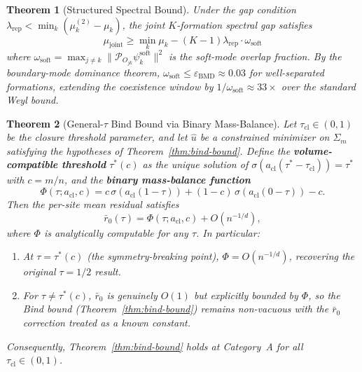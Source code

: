 \documentclass[lettersize,journal]{IEEEtran}
\newtheorem{theorem}{Theorem}
\begin{document}
\begin{theorem}[Structured Spectral Bound]
\label{thm:beyond-weyl}
Under the gap condition $\lambda_{\mathrm{rep}} < \min_k(\mu_k^{(2)} - \mu_k)$, the joint $K$-formation spectral gap satisfies
\begin{equation}
\label{eq:beyond-weyl}
\mu_{\mathrm{joint}} \geq \min_k \mu_k - (K-1)\lambda_{\mathrm{rep}} \cdot \omega_{\mathrm{soft}}
\end{equation}
where $\omega_{\mathrm{soft}} = \max_{j \neq k} \|\mathcal{P}_{O_{jk}} \psi_k^{\mathrm{soft}}\|^2$ is the soft-mode overlap fraction. By the boundary-mode dominance theorem, $\omega_{\mathrm{soft}} \leq \varepsilon_{\mathrm{BMD}} \approx 0.03$ for well-separated formations, extending the coexistence window by $1/\omega_{\mathrm{soft}} \approx 33\times$ over the standard Weyl bound.
\end{theorem}

\begin{theorem}[General-$\tau$ Bind Bound via Binary Mass-Balance]
\label{thm:bind-general-tau}
Let $\tau_{\mathrm{cl}} \in (0,1)$ be the closure threshold parameter, and let $\hat{u}$ be a constrained minimizer on $\Sigma_m$ satisfying the hypotheses of Theorem~\ref{thm:bind-bound}. Define the \textbf{volume-compatible threshold} $\tau^*(c)$ as the unique solution of $\sigma(a_{\mathrm{cl}}(\tau^* - \tau_{\mathrm{cl}})) = \tau^*$ with $c = m/n$, and the \textbf{binary mass-balance function}
\begin{equation}
\label{eq:mass-balance}
\Phi(\tau; a_{\mathrm{cl}}, c) = c\,\sigma(a_{\mathrm{cl}}(1 - \tau)) + (1-c)\,\sigma(a_{\mathrm{cl}}(0 - \tau)) - c.
\end{equation}
Then the per-site mean residual satisfies
\begin{equation}
\label{eq:rbar-general-tau}
\bar{r}_0(\tau) = \Phi(\tau; a_{\mathrm{cl}}, c) + O(n^{-1/d}),
\end{equation}
where $\Phi$ is analytically computable for any $\tau$. In particular:
\begin{enumerate}
\item At $\tau = \tau^*(c)$ (the symmetry-breaking point), $\Phi = O(n^{-1/d})$, recovering the original $\tau = 1/2$ result.
\item For $\tau \neq \tau^*(c)$, $\bar{r}_0$ is genuinely $O(1)$ but \emph{explicitly bounded} by $\Phi$, so the Bind bound (Theorem~\ref{thm:bind-bound}) remains non-vacuous with the $\bar{r}_0$ correction treated as a known constant.
\end{enumerate}
Consequently, Theorem~\ref{thm:bind-bound} holds at Category~A for all $\tau_{\mathrm{cl}} \in (0,1)$.
\end{theorem}
\end{document}

